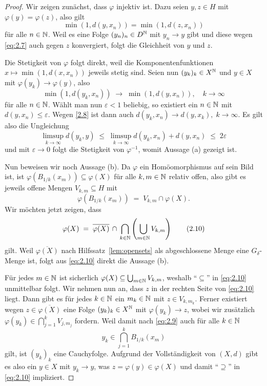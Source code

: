 \documentclass[../main/main.tex]{subfiles}
\begin{document}
	\begin{proof}
		Wir zeigen zunächst, dass $\varphi$ injektiv ist. 
		Dazu seien $y, z \in H$ mit $\varphi(y) = \varphi(z)$, also gilt
		\[\min(1, d(y, x_n)) = \min(1, d(z, x_n)) \label{eq:2.7} \tag{2.7}\]
		für alle $n \in \mathbb{N}$. Weil es eine Folge $(y_n)_n \in D^{\mathbb{N}}$ mit 
		$y_n \to y$ gibt und diese wegen \eqref{eq:2.7} auch gegen $z$ 
		konvergiert, folgt die Gleichheit von $y$ und $z$.
		
		Die Stetigkeit von $\varphi$ folgt direkt, weil die 
		Komponentenfunktionen $x \mapsto \min(1, d(x, x_n))$ jeweils stetig sind. 
		Seien nun $(y_k)_k \in X^{\mathbb{N}}$ und $y \in X$ mit $\varphi(y_k) \to \varphi(y)$, 
		also
		\[\min(1, d(y_k, x_n)) \; \to \; \min(1, d(y, x_n)), 
		\quad k \to \infty \label{2.8} \tag{2.8}\]
		für alle $n \in \mathbb{N}$. Wählt man nun $\varepsilon < 1$ beliebig, 
		so existiert ein $n \in \mathbb{N}$ mit $d(y, x_n) \leq \varepsilon$. 
		Wegen \eqref{2.8} ist dann auch
		$d(y_k, x_n) \to d(y, x_k), \; k \to \infty$. Es gilt also die Ungleichung
		$$\limsup_{k \to \infty} d(y_k, y) \; \leq \; 
		\limsup_{k \to \infty} d(y_k, x_n) + d(y, x_n) \; \leq \; 2\varepsilon$$
		und mit $\varepsilon \to 0$ folgt die Stetigkeit von $\varphi^{-1}$, 
		womit Aussage (a) gezeigt ist.
		
		Nun beweisen wir noch Aussage (b). Da $\varphi$ ein Homöomorphismus auf sein 
		Bild ist, ist $\varphi(B_{1/k}(x_m)) \subseteq \varphi(X)$ für alle 
		$k, m \in \mathbb{N}$ relativ offen, also gibt es jeweils offene Mengen 
		$V_{k, m} \subseteq H$ mit
		\[\varphi(B_{1/k}(x_m)) \; = \; V_{k, m} 
		\cap \varphi(X) \text{.} \label{eq:2.9} \tag{2.9}\]
		Wir möchten jetzt zeigen, dass
		\[\varphi(X) \; = \; \overline{\varphi(X)} \, \cap \, 
		\bigcap_{k \in \mathbb{N}} \left( \bigcup_{m \in \mathbb{N}} V_{k, m} \right) 
		\label{eq:2.10} \tag{2.10}\]
		gilt. 
		Weil $\overline{\varphi(X)}$ nach Hilfssatz~\ref{lem:opensets} 
		als abgeschlossene Menge eine $G_\delta$-Menge ist, 
		folgt aus \eqref{eq:2.10} direkt die Aussage (b).
		
		Für jedes $m \in \mathbb{N}$ ist sicherlich $\varphi(X) \subseteq 
		\bigcup_{m \in \mathbb{N}} V_{k, m}$, weshalb \enquote{$\subseteq$} 
		in \eqref{eq:2.10} unmittelbar folgt.
		Wir nehmen nun an, dass $z$ in der rechten Seite von \eqref{eq:2.10} liegt. 
		Dann gibt es für jedes $k \in \mathbb{N}$ ein $m_k \in \mathbb{N}$ mit $z \in V_{k, m_k}$. 
		Ferner existiert wegen $z \in \overline{\varphi(X)}$ eine Folge $(y_k)_k \in X^{\mathbb{N}}$ 
		mit $\varphi(y_k) \to z$, wobei wir zusätzlich
		$\varphi(y_k) \in \bigcap_{j=1}^{k} V_{j, m_j}$
		fordern. Weil damit nach \eqref{eq:2.9} auch für alle $k \in \mathbb{N}$
		\[y_k \in \bigcap_{j=1}^{k} B_{1/k}(x_m)\]
		gilt, ist $(y_k)_k$ eine Cauchyfolge. Aufgrund der Vollständigkeit von 
		$(X, d)$ gibt es also ein $y \in X$ mit $y_k \to y$, was 
		$z = \varphi(y) \in \varphi(X)$ und damit \enquote{$\supseteq$} 
		in \eqref{eq:2.10} impliziert.
		
	\end{proof}
	
\end{document}
